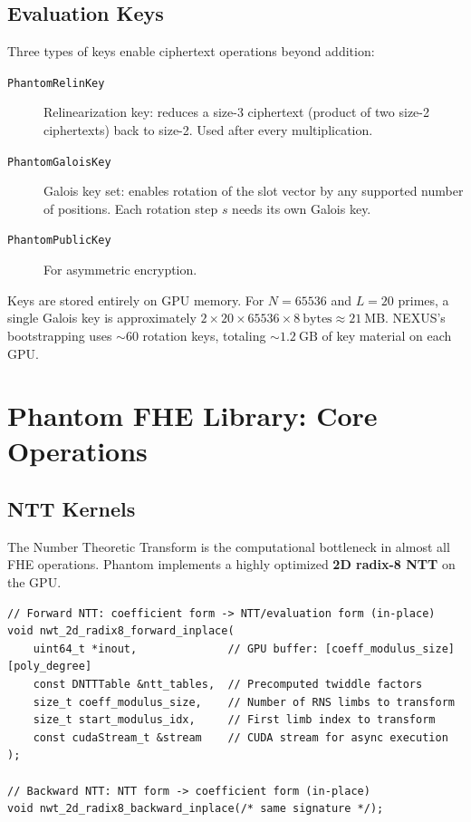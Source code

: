 \documentclass[11pt,letterpaper]{article}
\begin{document}
\subsection{Evaluation Keys}

Three types of keys enable ciphertext operations beyond addition:

\begin{description}
  \item[\texttt{PhantomRelinKey}] Relinearization key: reduces a size-3 ciphertext (product of two size-2 ciphertexts) back to size-2. Used after every multiplication.
  \item[\texttt{PhantomGaloisKey}] Galois key set: enables rotation of the slot vector by any supported number of positions. Each rotation step $s$ needs its own Galois key.
  \item[\texttt{PhantomPublicKey}] For asymmetric encryption.
\end{description}

Keys are stored entirely on GPU memory. For $N = 65536$ and $L = 20$ primes, a single
Galois key is approximately $2 \times 20 \times 65536 \times 8\ \text{bytes} \approx 21\
\text{MB}$. NEXUS's bootstrapping uses $\sim 60$ rotation keys, totaling $\sim 1.2\ \text{GB}$
of key material on each GPU.

\section{Phantom FHE Library: Core Operations}
\label{sec:phantom-ops}

\subsection{NTT Kernels}

The Number Theoretic Transform is the computational bottleneck in almost all FHE operations.
Phantom implements a highly optimized \textbf{2D radix-8 NTT} on the GPU.

\begin{lstlisting}[style=cpp, caption=NTT kernel interface (ntt.cuh)]
// Forward NTT: coefficient form -> NTT/evaluation form (in-place)
void nwt_2d_radix8_forward_inplace(
    uint64_t *inout,              // GPU buffer: [coeff_modulus_size][poly_degree]
    const DNTTTable &ntt_tables,  // Precomputed twiddle factors
    size_t coeff_modulus_size,    // Number of RNS limbs to transform
    size_t start_modulus_idx,     // First limb index to transform
    const cudaStream_t &stream    // CUDA stream for async execution
);

// Backward NTT: NTT form -> coefficient form (in-place)
void nwt_2d_radix8_backward_inplace(/* same signature */);
\end{lstlisting}
\end{document}
